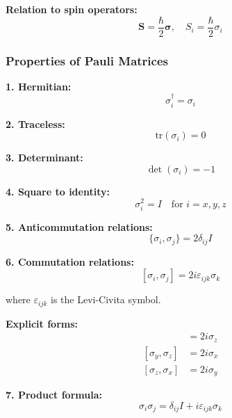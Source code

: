 \documentclass[11pt,a4paper]{article}
\begin{document}
\textbf{Relation to spin operators:}
\begin{equation}
\boxed{\mathbf{S} = \frac{\hbar}{2}\boldsymbol{\sigma}, \quad S_i = \frac{\hbar}{2}\sigma_i}
\tag{S.6}
\end{equation}

\subsubsection{Properties of Pauli Matrices}

\textbf{1. Hermitian:}
\begin{equation}
\sigma_i^\dagger = \sigma_i
\tag{S.7}
\end{equation}

\textbf{2. Traceless:}
\begin{equation}
\text{tr}(\sigma_i) = 0
\tag{S.8}
\end{equation}

\textbf{3. Determinant:}
\begin{equation}
\det(\sigma_i) = -1
\tag{S.9}
\end{equation}

\textbf{4. Square to identity:}
\begin{equation}
\boxed{\sigma_i^2 = I \quad \text{for } i = x, y, z}
\tag{S.10}
\end{equation}

\textbf{5. Anticommutation relations:}
\begin{equation}
\boxed{\{\sigma_i, \sigma_j\} = 2\delta_{ij}I}
\tag{S.11}
\end{equation}

\textbf{6. Commutation relations:}
\begin{equation}
\boxed{[\sigma_i, \sigma_j] = 2i\varepsilon_{ijk}\sigma_k}
\tag{S.12}
\end{equation}

where $\varepsilon_{ijk}$ is the Levi-Civita symbol.

\textbf{Explicit forms:}
\begin{align}
[\sigma_x, \sigma_y] &= 2i\sigma_z \tag{S.13a} \\
[\sigma_y, \sigma_z] &= 2i\sigma_x \tag{S.13b} \\
[\sigma_z, \sigma_x] &= 2i\sigma_y \tag{S.13c}
\end{align}

\textbf{7. Product formula:}
\begin{equation}
\boxed{\sigma_i\sigma_j = \delta_{ij}I + i\varepsilon_{ijk}\sigma_k}
\tag{S.14}
\end{equation}
\end{document}
